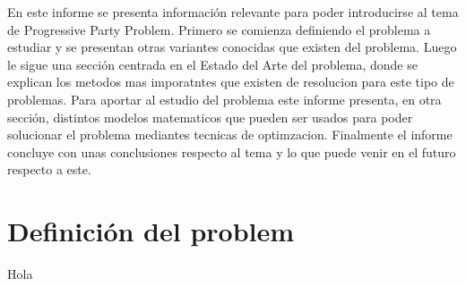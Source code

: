 \documentclass[spanish, fleqn]{article}
\begin{document}
En este informe se presenta información relevante para poder introducirse al tema de Progressive Party Problem. Primero se comienza definiendo el problema a estudiar y se presentan otras variantes conocidas que existen del problema. Luego le sigue una sección centrada en el Estado del Arte del problema, donde se explican los metodos mas imporatntes que existen de resolucion para este tipo de problemas. Para aportar al estudio del problema este informe presenta, en otra sección, distintos modelos matematicos que pueden ser usados para poder solucionar el problema mediantes tecnicas de optimzacion. Finalmente el informe concluye con unas conclusiones respecto al tema y lo que puede venir en el futuro respecto a este.

\section{Definición del problem}

Hola



\end{document}
